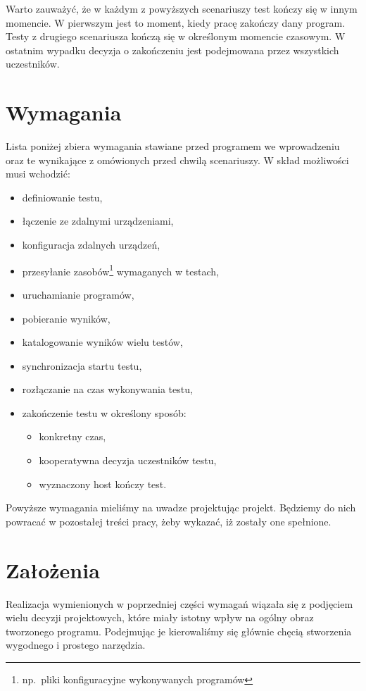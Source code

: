 \documentclass[00-praca-magisterska.tex]{subfiles}
\begin{document}
Warto zauważyć, że w każdym z powyższych scenariuszy test kończy się w innym
momencie. W pierwszym jest to moment, kiedy pracę zakończy dany program. Testy
z drugiego scenariusza kończą się w określonym momencie czasowym. W ostatnim
wypadku decyzja o zakończeniu jest podejmowana przez wszystkich uczestników.

\section{Wymagania}

Lista poniżej zbiera wymagania stawiane przed programem we wprowadzeniu oraz te
wynikające z omówionych przed chwilą scenariuszy. W skład możliwości musi wchodzić:
\begin{itemize}
\item definiowanie testu,
\item łączenie ze zdalnymi urządzeniami,
\item konfiguracja zdalnych urządzeń,
\item przesyłanie zasobów\footnote{np.~pliki konfiguracyjne wykonywanych programów}  wymaganych w testach,
\item uruchamianie programów,
\item pobieranie wyników,
\item katalogowanie wyników wielu testów,
\item synchronizacja startu testu,
\item rozłączanie na czas wykonywania testu,
\item zakończenie testu w określony sposób:
  \begin{itemize}
  \item konkretny czas,
  \item kooperatywna decyzja uczestników testu,
  \item wyznaczony host kończy test.
  \end{itemize}
\end{itemize}

Powyższe wymagania mieliśmy na uwadze projektując projekt. Będziemy do nich
powracać w pozostałej treści pracy, żeby wykazać, iż zostały one spełnione.

\section{Założenia}

Realizacja wymienionych w poprzedniej części wymagań wiązała się z podjęciem
wielu decyzji projektowych, które miały istotny wpływ na ogólny obraz tworzonego
programu.  Podejmując je kierowaliśmy się głównie chęcią stworzenia wygodnego i
prostego narzędzia.
\end{document}
